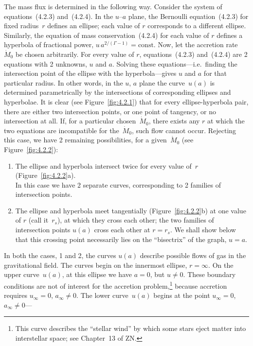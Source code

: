 The mass flux is determined in the following way.  Consider the system of
equations~(4.2.3) and~(4.2.4).  In the $u$--$a$ plane, the Bernoulli
equation~(4.2.3) for fixed radius~$r$ defines an ellipse; each value of $r$
corresponds to a different ellipse.  Similarly, the equation of mass
conservation~(4.2.4) for each value of $r$ defines a hyperbola of fractional
power, $u\,a^{2/(\Gamma-1)} = \text{const}$.  Now, let the accretion
rate~$\dot{M}_0$ be chosen arbitrarily.  For every value of $r$,
equations~(4.2.3) and~(4.2.4) are 2 equations with 2 unknowns, $u$ and $a$.
Solving these equations---i.e.\ finding the intersection point of the ellipse
with the hyperbola---gives $u$ and $a$ for that particular radius.  In other
words, in the $u$, $a$ plane the curve~$u(a)$ is determined parametrically by
the intersections of corresponding ellipses and hyperbolae.  It is clear (see
Figure~\ref{fig:4.2.1}) that for every ellipse-hyperbola pair, there are
either two intersection points, or one point of tangency, or no intersection
at all.  If, for a particular chosen~$\dot{M}_0$, there exists any $r$ at
which the two equations are incompatible for the~$\dot{M}_0$, such flow
cannot occur.  Rejecting this case, we have 2 remaining possibilities, for a
given~$\dot{M}_0$ (see Figure~\ref{fig:4.2.2}):

\begin{enumerate}
\item The ellipse and hyperbola intersect twice for every value of~$r$
  (Figure~\ref{fig:4.2.2}a).\\
  In this case we have 2 separate curves, corresponding to 2 families of
  intersection points.

\item The ellipse and hyperbola meet tangentially
  (Figure~\ref{fig:4.2.2}b) at one value of $r$ (call it~$r_s$), at which
  they cross each other; the two families of intersection points $u(a)$
  cross each other at $r = r_s$.  We shall show below that this
  crossing point necessarily lies on the ``bisectrix'' of the graph,
  $u = a$.
\end{enumerate}

In both the cases, 1 and 2, the curves $u(a)$ describe possible flows of gas
in the gravitational field.  The curves begin on the innermost ellipse,
$r = \infty$.  On the upper curve~$u(a)$, at this ellipse we have $a = 0$,
but $u \neq 0$.  These boundary conditions are not of interest for the
accretion problem,\footnote{This curve describes the ``stellar wind'' by
which some stars eject matter into interstellar space; see Chapter~13 of
ZN.} because accretion requires $u_\infty = 0$,
$a_\infty \neq 0$.  The lower curve~$u(a)$ begins at the point
$u_\infty = 0$, $a_\infty \neq 0$---

